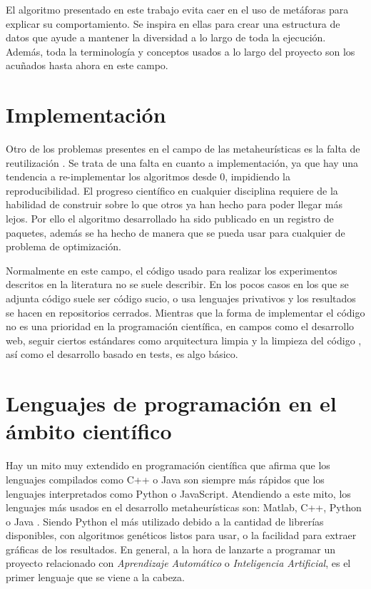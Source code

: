 El algoritmo presentado en este trabajo evita caer en el uso de metáforas para explicar su comportamiento. Se inspira en ellas para crear una estructura de datos que ayude 
a mantener la diversidad a lo largo de toda la ejecución. Además, toda la terminología y conceptos usados a lo largo del proyecto son los acuñados hasta ahora en este campo.

\section{Implementación}

Otro de los problemas presentes en el campo de las metaheurísticas es la falta de reutilización \cite{metaheuristics}. Se trata de una falta en cuanto a implementación, ya que hay una
tendencia a re-implementar los algoritmos desde 0, impidiendo la reproducibilidad. El progreso científico en cualquier disciplina requiere de la habilidad de construir sobre lo que
otros ya han hecho para poder llegar más lejos. Por ello el algoritmo desarrollado ha sido publicado en un registro de paquetes, además se ha hecho de manera que se pueda usar para 
cualquier de problema de optimización. 

Normalmente en este campo, el código usado para realizar los experimentos descritos en la literatura no se suele describir. En los
pocos casos en los que se adjunta código suele ser código sucio, o usa lenguajes privativos y los resultados se hacen en repositorios cerrados. 
Mientras que la forma de implementar el código no es una prioridad en la programación científica, 
en campos como el desarrollo web, seguir ciertos estándares como arquitectura limpia \cite{cleanArquitecture2017} y la 
limpieza del código \cite{cleanCode2008}, así como el desarrollo basado en tests, es algo básico.

\section{Lenguajes de programación en el ámbito científico}

Hay un mito muy extendido en programación científica que afirma que los lenguajes compilados como C++ o Java son siempre más rápidos que los lenguajes interpretados como Python o 
JavaScript. Atendiendo a este mito, los lenguajes más usados en el desarrollo metaheurísticas son: Matlab, C++, Python o Java \cite{languages}. Siendo Python el más 
utilizado debido a la cantidad de librerías disponibles, con algoritmos genéticos listos para usar, o la facilidad para extraer gráficas de los resultados. En general, a 
la hora de lanzarte a programar un proyecto relacionado con \emph{Aprendizaje Automático} o \emph{Inteligencia Artificial}, es el primer lenguaje que se viene a la cabeza. 

